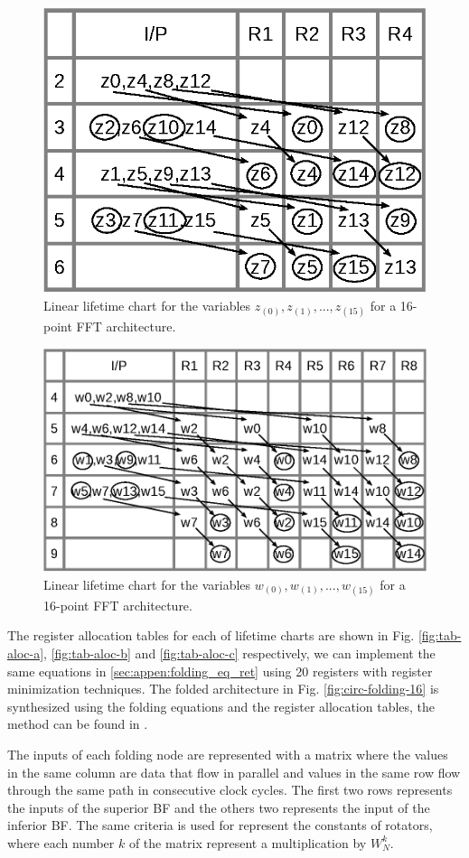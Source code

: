 \documentclass[a4paper, 10pt, conference]{ieeeconf}
\begin{document}
\begin{figure}[ht!]
\centering
 \includegraphics[width=0.7\linewidth]{Diagramas/tab_life_b.eps}%
\caption{Linear lifetime chart for the variables $z_{(0)}, z_{(1)},...,z_{(15)}$ for a 16-point FFT architecture.}
\label{fig:tab-life-b}
\end{figure}

\begin{figure}[ht!]
\centering
 \includegraphics[width=0.8\linewidth]{Diagramas/tab_life_c.eps}%
\caption{Linear lifetime chart for the variables $w_{(0)}, w_{(1)},...,w_{(15)}$ for a 16-point FFT architecture.}
\label{fig:tab-life-c}
\end{figure}


The register allocation tables for each of lifetime charts are shown in Fig. \ref{fig:tab-aloc-a}, \ref{fig:tab-aloc-b} and \ref{fig:tab-aloc-c} respectively, we can implement the same equations in \ref{sec:appen:folding_eq_ret} using 20 registers with register minimization techniques. The folded architecture in Fig. \ref{fig:circ-folding-16} is synthesized using the folding equations and the register allocation tables, the method can be found in \cite{pipeline_parhi_book}. 

The inputs of each folding node are represented with a matrix where the values in the same column are data that flow in parallel and values in the same row
flow through the same path in consecutive clock cycles. The first two rows represents the inputs of the superior BF and the others two represents the input of the inferior BF. 
The same criteria is used for represent the constants of rotators, where each number $k$ of the matrix represent a multiplication by $W^k_N$.
\end{document}
